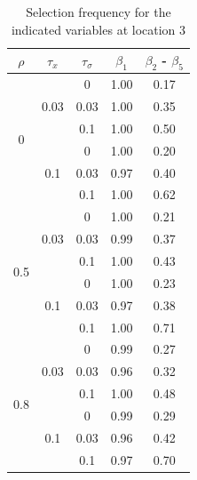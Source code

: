 \documentclass[authoryear, review, 11pt]{elsarticle}
\begin{document}
		
		\begin{table}[ht]
		\begin{center}
		\begin{tabular}{ccc|cc}
		$\rho$ & $\tau_x$ & $\tau_\sigma$ &  $\beta_1$ & $\beta_2$ - $\beta_5$ \\ 
		  \hline
		\multirow{6}{*}{0} & \multirow{3}{*}{0.03} & 0 & 1.00 & 0.17 \\ 
		 &  & 0.03 &   1.00 & 0.35 \\ 
		 &  & 0.1 &   1.00 & 0.50 \\ \cline{2-5}
		 & \multirow{3}{*}{0.1} & 0 &   1.00 & 0.20 \\ 
		 &  & 0.03 &   0.97 & 0.40 \\ 
		 &  & 0.1 &   1.00 & 0.62 \\ \cline{1-5}
		\multirow{6}{*}{0.5} & \multirow{3}{*}{0.03} & 0 &   1.00 & 0.21 \\ 
		 &  & 0.03 &   0.99 & 0.37 \\ 
		 &  & 0.1 &   1.00 & 0.43 \\ \cline{2-5}
		 & \multirow{3}{*}{0.1} & 0 &   1.00 & 0.23 \\ 
		 &  & 0.03 &   0.97 & 0.38 \\ 
		 &  & 0.1 &   1.00 & 0.71 \\ \cline{1-5}
		\multirow{6}{*}{0.8} & \multirow{3}{*}{0.03} & 0 &   0.99 & 0.27 \\ 
		 &  & 0.03 &   0.96 & 0.32 \\ 
		 &  & 0.1 &   1.00 & 0.48 \\ \cline{2-5}
		 & \multirow{3}{*}{0.1} & 0 &   0.99 & 0.29 \\ 
		 &  & 0.03 &   0.96 & 0.42 \\ 
		 &  & 0.1 &   0.97 & 0.70 \\ 
		  \end{tabular}
		\caption{Selection frequency for the indicated variables at location 3\label{table:loc3-selection}}
		\end{center}
		\end{table}
		
\end{document}
